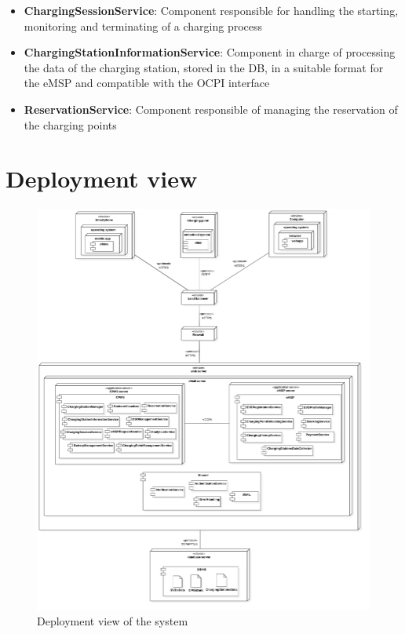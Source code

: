 \begin{itemize}
    \item \textbf{ChargingSessionService}: Component responsible for handling the starting, monitoring and terminating of a charging process

    \item \textbf{ChargingStationInformationService}: Component in charge of processing the data of the charging station, stored in the DB, in a suitable format for the eMSP and compatible with the OCPI interface

    \item \textbf{ReservationService}: Component responsible of managing the reservation of the charging points 

\end{itemize}

\section{Deployment view}
\begin{figure}[H]
    \centering
    \includegraphics[width=1\textwidth, height=0.9\textheight]{Images/cp2/DeploymentDiagram.png}
    \caption{Deployment view of the system}
\end{figure}
